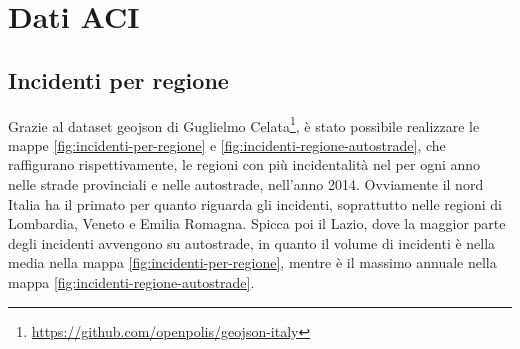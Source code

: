 \documentclass[a4paper]{report}
\begin{document}





\section{Dati ACI}


\subsection{Incidenti per regione}

Grazie al dataset geojson di Guglielmo Celata\footnote{\url{https://github.com/openpolis/geojson-italy}}, 
è stato possibile realizzare le mappe \ref{fig:incidenti-per-regione} 
e \ref{fig:incidenti-regione-autostrade}, che raffigurano rispettivamente, le regioni con 
più incidentalità nel per ogni anno nelle strade provinciali e nelle autostrade, nell'anno 2014.
Ovviamente il nord Italia ha il primato per quanto riguarda gli incidenti, soprattutto nelle regioni 
di Lombardia, Veneto e Emilia Romagna. 
Spicca poi il Lazio, dove la maggior parte degli incidenti avvengono su autostrade, in quanto il volume 
di incidenti è nella media nella mappa \ref{fig:incidenti-per-regione}, mentre è il massimo annuale nella 
mappa \ref{fig:incidenti-regione-autostrade}.
\end{document}

